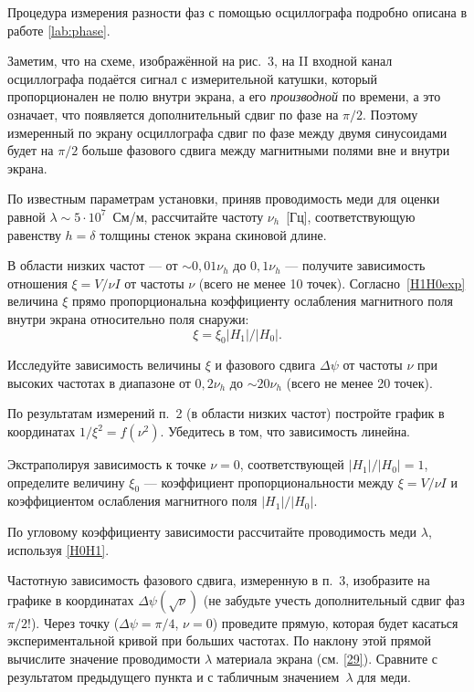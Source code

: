 Процедура измерения разности фаз с помощью осциллографа
подробно описана в работе \ref{lab:phase}.

Заметим, что на схеме, изображённой на рис.~3, на II входной канал
осциллографа подаётся сигнал с измерительной катушки, который пропорционален
не полю внутри экрана, а его \emph{производной} по времени, а это означает,
что появляется дополнительный сдвиг по фазе на $\pi/2$. Поэтому измеренный
по экрану осциллографа сдвиг по фазе между двумя синусоидами будет
на $\pi/2$ больше фазового сдвига между магнитными полями вне и
внутри экрана.



\begin{lab:task}
\item По известным параметрам установки, приняв проводимость меди
для оценки равной $\lambda \sim 5\cdot 10^{7}$~См/м, рассчитайте частоту
$\nu_h$~[Гц], соответствующую равенству $h=\delta$ толщины стенок экрана
скиновой длине.

\item В области низких частот --- от  $\sim 0,01\nu_h$ до $0,1\nu_{h}$ --- получите зависимость отношения $\xi = V/\nu I$ от
частоты $\nu$ (всего не менее 10 точек). Согласно~\eqref{H1H0exp} величина $\xi$ прямо
пропорциональна коэффициенту ослабления магнитного поля внутри
экрана относительно поля снаружи:
\[\xi=\xi_0 |H_1|/|H_0|.\]

\item Исследуйте зависимость величины $\xi$
и фазового сдвига $\Delta\psi$ от частоты $\nu$ при высоких частотах
в диапазоне от $0,2\nu_h$ до $\sim 20\nu_h$
(всего не менее 20 точек).


\item По результатам измерений п.~2 (в области низких частот)
постройте график в координатах $1/\xi^2=f(\nu^2)$.
Убедитесь в том, что зависимость линейна.

Экстраполируя зависимость к точке $\nu=0$, соответствующей
$|H_1|/|H_0|=1$, определите величину $\xi_0$ --- коэффициент
пропорциональности между $\xi=V/\nu I$ и коэффициентом ослабления магнитного поля
$|H_1|/|H_0|$.

По угловому коэффициенту зависимости рассчитайте проводимость меди $\lambda$,
используя \eqref{H0H1}.

\item Частотную зависимость фазового сдвига,
измеренную в п.~3, изобразите на графике в координатах
$\Delta\psi(\sqrt{\nu})$ (не забудьте учесть дополнительный сдвиг фаз $\pi/2$!).
Через точку ($\Delta\psi=\pi/4$, $\nu=0$) проведите прямую,
которая будет касаться экспериментальной кривой при больших частотах.
По наклону этой прямой вычислите значение проводимости $\lambda$ материала экрана
(см. \eqref{29}).
Сравните с результатом предыдущего пункта и с табличным значением~$\lambda$ для меди.


\end{lab:task}
